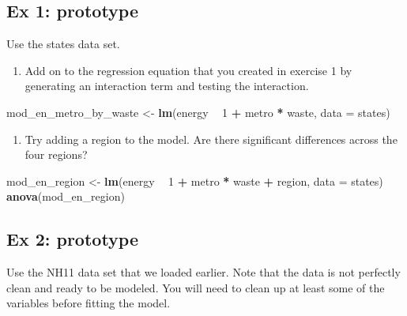 \documentclass[
]{book}
\newenvironment{Shaded}{\begin{snugshade}}{\end{snugshade}}
\newcommand{\DataTypeTok}[1]{\textcolor[rgb]{0.13,0.29,0.53}{#1}}
\newcommand{\DecValTok}[1]{\textcolor[rgb]{0.00,0.00,0.81}{#1}}
\newcommand{\KeywordTok}[1]{\textcolor[rgb]{0.13,0.29,0.53}{\textbf{#1}}}
\newcommand{\NormalTok}[1]{#1}
\newcommand{\OperatorTok}[1]{\textcolor[rgb]{0.81,0.36,0.00}{\textbf{#1}}}
\newcommand{\StringTok}[1]{\textcolor[rgb]{0.31,0.60,0.02}{#1}}
\providecommand{\tightlist}{%
  \setlength{\itemsep}{0pt}\setlength{\parskip}{0pt}}
\begin{document}
\hypertarget{ex-1-prototype-1}{%
\subsection{Ex 1: prototype}\label{ex-1-prototype-1}}

Use the states data set.

\begin{enumerate}
\def\labelenumi{\arabic{enumi}.}
\tightlist
\item
  Add on to the regression equation that you created in exercise 1 by generating an interaction term and testing the interaction.
\end{enumerate}

\begin{Shaded}
\begin{Highlighting}[]
\NormalTok{  mod_en_metro_by_waste <-}\StringTok{ }\KeywordTok{lm}\NormalTok{(energy }\OperatorTok{~}\StringTok{ }\DecValTok{1} \OperatorTok{+}\StringTok{ }\NormalTok{metro }\OperatorTok{*}\StringTok{ }\NormalTok{waste, }\DataTypeTok{data =}\NormalTok{ states)}
\end{Highlighting}
\end{Shaded}

\begin{enumerate}
\def\labelenumi{\arabic{enumi}.}
\setcounter{enumi}{1}
\tightlist
\item
  Try adding a region to the model. Are there significant differences across the four regions?
\end{enumerate}

\begin{Shaded}
\begin{Highlighting}[]
\NormalTok{  mod_en_region <-}\StringTok{ }\KeywordTok{lm}\NormalTok{(energy }\OperatorTok{~}\StringTok{ }\DecValTok{1} \OperatorTok{+}\StringTok{ }\NormalTok{metro }\OperatorTok{*}\StringTok{ }\NormalTok{waste }\OperatorTok{+}\StringTok{ }\NormalTok{region, }\DataTypeTok{data =}\NormalTok{ states)}
  \KeywordTok{anova}\NormalTok{(mod_en_region)}
\end{Highlighting}
\end{Shaded}

\hypertarget{ex-2-prototype}{%
\subsection{Ex 2: prototype}\label{ex-2-prototype}}

Use the NH11 data set that we loaded earlier. Note that the data is not perfectly clean and ready to be modeled. You will need to clean up at least some of the variables before fitting the model.
\end{document}
